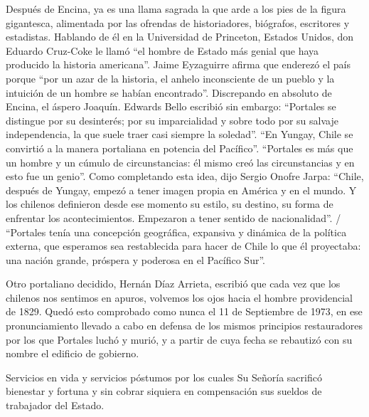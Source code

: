 \documentclass[10pt,twoside,openright]{memoir}
\begin{document}
Después de Encina, ya es una llama sagrada la que arde a los pies de la
figura gigantesca, alimentada por las ofrendas de historiadores,
biógrafos, escritores y estadistas. Hablando de él en la Universidad de
Princeton, Estados Unidos, don Eduardo Cruz-Coke le llamó ``el hombre de
Estado más genial que haya producido la historia americana''. Jaime
Eyzaguirre afirma que enderezó el país porque ``por un azar de la
historia, el anhelo inconsciente de un pueblo y la intuición de un
hombre se habían encontrado''. Discrepando en absoluto de Encina, el
áspero Joaquín. Edwards Bello escribió sin embargo: ``Portales se
distingue por su desinterés; por su imparcialidad y sobre todo por su
salvaje independencia, la que suele traer casi siempre la soledad''. ``En
Yungay, Chile se convirtió a la manera portaliana en potencia del
Pacífico''. ``Portales es más que un hombre y un cúmulo de circunstancias:
él mismo creó las circunstancias y en esto fue un genio''. Como
completando esta idea, dijo Sergio Onofre Jarpa: ``Chile, después de
Yungay, empezó a tener imagen propia en América y en el mundo. Y los
chilenos definieron desde ese momento su estilo, su destino, su forma de
enfrentar los acontecimientos. Empezaron a tener sentido de
nacionalidad''. / ``Portales tenía una concepción geográfica, expansiva y
dinámica de la política externa, que esperamos sea restablecida para
hacer de Chile lo que él proyectaba: una nación grande, próspera y
poderosa en el Pacífico Sur''.

Otro portaliano decidido, Hernán Díaz Arrieta, escribió que cada vez que
los chilenos nos sentimos en apuros, volvemos los ojos hacia el hombre
providencial de 1829. Quedó esto comprobado como nunca el 11 de
Septiembre de 1973, en ese pronunciamiento llevado a cabo en defensa de
los mismos principios restauradores por los que Portales luchó y murió,
y a partir de cuya fecha se rebautizó con su nombre el edificio de
gobierno.

Servicios en vida y servicios póstumos por los cuales Su Señoría
sacrificó bienestar y fortuna y sin cobrar siquiera en compensación sus
sueldos de trabajador del Estado.
\end{document}
